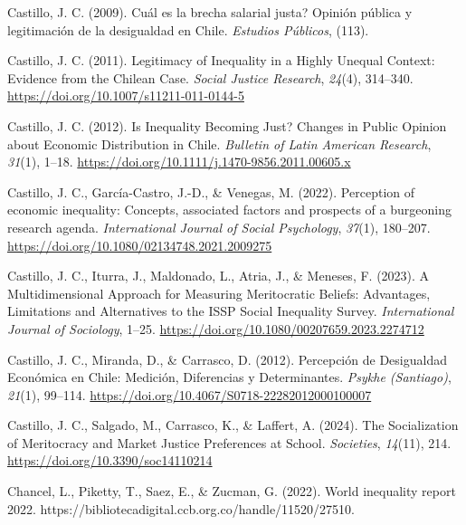 \documentclass[
  12pt,
]{article}
\newlength{\cslhangindent}
\newlength{\cslentryspacingunit} %
\newenvironment{CSLReferences}[2] %
 {%
  \setlength{\parindent}{0pt}
  \ifodd #1
  \let\oldpar\par
  \def\par{\hangindent=\cslhangindent\oldpar}
  \fi
  \setlength{\parskip}{#2\cslentryspacingunit}
 }%
 {}
\begin{document}
\begin{CSLReferences}{1}{0}
\leavevmode{}%
Castillo, J. C. (2009). {{\textquestiondown}Cu{á}l es la brecha salarial
justa? Opini{ó}n p{ú}blica y legitimaci{ó}n de la desigualdad en Chile}.
\emph{Estudios P{ú}blicos}, (113).

\leavevmode{}%
Castillo, J. C. (2011). Legitimacy of {Inequality} in a {Highly Unequal
Context}: {Evidence} from the {Chilean Case}. \emph{Social Justice
Research}, \emph{24}(4), 314--340.
\url{https://doi.org/10.1007/s11211-011-0144-5}

\leavevmode{}%
Castillo, J. C. (2012). Is {Inequality Becoming Just}? {Changes} in
{Public Opinion} about {Economic Distribution} in {Chile}.
\emph{Bulletin of Latin American Research}, \emph{31}(1), 1--18.
\url{https://doi.org/10.1111/j.1470-9856.2011.00605.x}

\leavevmode{}%
Castillo, J. C., García-Castro, J.-D., \& Venegas, M. (2022). Perception
of economic inequality: Concepts, associated factors and prospects of a
burgeoning research agenda. \emph{International Journal of Social
Psychology}, \emph{37}(1), 180--207.
\url{https://doi.org/10.1080/02134748.2021.2009275}

\leavevmode{}%
Castillo, J. C., Iturra, J., Maldonado, L., Atria, J., \& Meneses, F.
(2023). A {Multidimensional Approach} for {Measuring Meritocratic
Beliefs}: {Advantages}, {Limitations} and {Alternatives} to the {ISSP
Social Inequality Survey}. \emph{International Journal of Sociology},
1--25. \url{https://doi.org/10.1080/00207659.2023.2274712}

\leavevmode{}%
Castillo, J. C., Miranda, D., \& Carrasco, D. (2012). Percepci{ó}n de
{Desigualdad Econ{ó}mica} en {Chile}: {Medici{ó}n}, {Diferencias} y
{Determinantes}. \emph{Psykhe (Santiago)}, \emph{21}(1), 99--114.
\url{https://doi.org/10.4067/S0718-22282012000100007}

\leavevmode{}%
Castillo, J. C., Salgado, M., Carrasco, K., \& Laffert, A. (2024). The
{Socialization} of {Meritocracy} and {Market Justice Preferences} at
{School}. \emph{Societies}, \emph{14}(11), 214.
\url{https://doi.org/10.3390/soc14110214}

\leavevmode{}%
Chancel, L., Piketty, T., Saez, E., \& Zucman, G. (2022). World
inequality report 2022.
https://bibliotecadigital.ccb.org.co/handle/11520/27510.


\end{CSLReferences}
\end{document}
